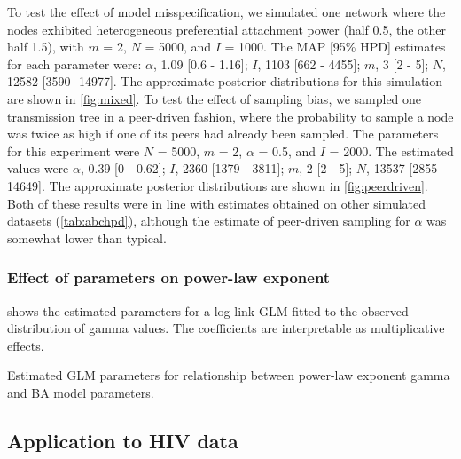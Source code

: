 To test the effect of model misspecification, we simulated one network where
the nodes exhibited heterogeneous preferential attachment power (half 0.5, the
other half 1.5), with $m$ = 2, $N$ = 5000, and $I$ = 1000. The MAP [95\%
HPD] estimates for each parameter were: 
$\alpha$, 
  1.09 
  [0.6 -
   1.16];
$I$,
  1103 
  [662 -
   4455];
$m$,
  3 
  [2 -
   5];
$N$,
  12582 
  [3590-
   14977].
The approximate posterior distributions for this simulation are shown in
\cref{fig:mixed}. To test the effect of sampling bias, we sampled one
transmission tree in a peer-driven fashion, where the probability to sample a
node was twice as high if one of its peers had already been sampled. The
parameters for this experiment were $N$ = 5000, $m$ = 2, $\alpha$ = 0.5, and
$I$ = 2000. The estimated values were
$\alpha$, 
  0.39 
  [0 -
   0.62];
$I$,
  2360 
  [1379 -
   3811];
$m$,
  2 
  [2 -
   5];
$N$,
  13537 
  [2855 -
   14649].
The approximate posterior distributions are shown in \cref{fig:peerdriven}. Both
of these results were in line with estimates obtained on other simulated
datasets (\cref{tab:abchpd}), although the estimate of peer-driven sampling for
$\alpha$ was somewhat lower than typical.

\subsubsection*{Effect of parameters on power-law exponent}

 shows the estimated parameters for a log-link \gls{GLM} fitted
to the observed distribution of \gls{gamma} values. The coefficients are
interpretable as multiplicative effects.

\begin{table}
    \centering
    
    \caption{Estimated \gls{GLM} parameters for relationship between power-law
    exponent \gls{gamma} and \gls{BA} model parameters.}
    \label{tab:glm}
\end{table}

\subsection{Application to HIV data}



